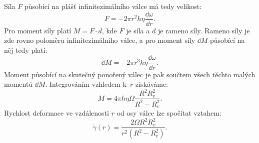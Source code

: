 \documentclass[12pt]{article}
\begin{document}
Síla $F$ působící na plášť infinitezimálního válce má tedy velikost:~\cite{book:Calibration_of_viscometers}
\begin{equation}
    F = -2\pi r^2h\eta\frac{\dd \omega}{\dd r}\text{.}
\end{equation}
Pro moment síly platí $M = F\cdot d$, kde $F$ je síla a $d$ je rameno síly. Rameno síly je zde rovno poloměru infinitezimálního válce, a pro moment síly $\dd M$ působící na něj tedy platí:
\begin{equation}
    \dd M = -2\pi r^3h\eta\frac{\dd \omega}{\dd r}\text{.}
\end{equation}
Moment působící na skutečný ponořený válec je pak součtem všech těchto malých momentů $\dd M$. Integrováním vzhledem k~$r$ získáváme:\footnotemark~\cite{book:Calibration_of_viscometers}\cite{Article:barr}
\begin{equation}
    M = 4\pi h\eta\Omega\frac{R^2R_v^2}{R^2-R_v^2}\text{.}
    \label{eq:moment_viskozimetr}
\end{equation}
Rychlost deformace ve vzdálenosti $r$ od osy válce lze spočítat vztahem:~\cite{material:brookfield_viscometers}
\begin{equation}
    \dot\gamma(r) = \frac{2\Omega R^2R_v^2}{r^2(R^2-R_v^2)}\text{.}
    \label{eq:viskozimetr_gamma}
\end{equation}
\end{document}
